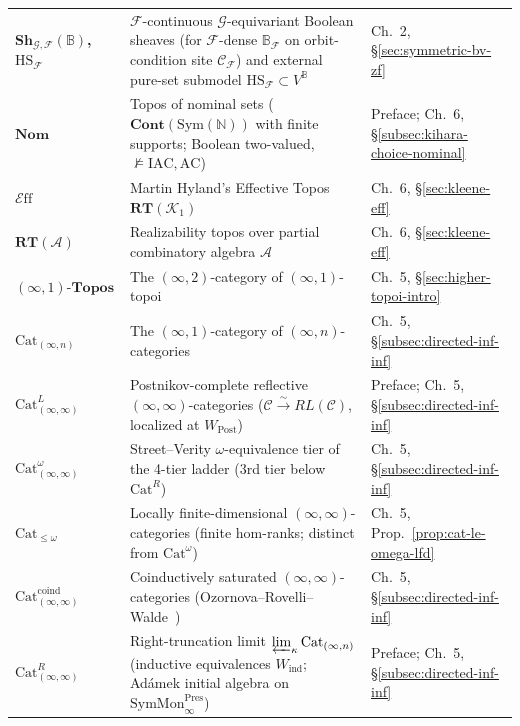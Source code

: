\documentclass[10pt,twoside,openright]{book}
\theoremstyle{crmplain}
\theoremstyle{crmdef}
\theoremstyle{crmremark}
\newcommand{\Eff}{\mathcal{E}\mathrm{ff}}
\begin{document}
{\begin{xltabular}{\textwidth}{@{}>{\bfseries}P{0.24\textwidth}YP{0.21\textwidth}@{}}
$\mathbf{Sh}_{\mathcal{G}, \mathcal{F}}(\mathbb{B})$,\, $\mathrm{HS}_{\mathcal{F}}$ & $\mathcal{F}$-continuous $\mathcal{G}$-equivariant Boolean sheaves (for $\mathcal{F}$-dense $\mathbb{B}_{\mathcal{F}}$ on orbit-condition site $\mathcal{C}_{\mathcal{F}}$) and external pure-set submodel $\mathrm{HS}_{\mathcal{F}} \subset V^{\mathbb{B}}$ & Ch.~2, \S\ref{sec:symmetric-bv-zf} \\
$\mathbf{Nom}$ & Topos of nominal sets ($\mathbf{Cont}(\mathrm{Sym}(\mathbb{N}))$ with finite supports; Boolean two-valued, $\not\models \mathrm{IAC}, \mathrm{AC}$) & Preface; Ch.~6, \S\ref{subsec:kihara-choice-nominal} \\
$\Eff$ & Martin Hyland's Effective Topos $\mathbf{RT}(\mathcal{K}_1)$ & Ch.~6, \S\ref{sec:kleene-eff} \\
$\mathbf{RT}(\mathcal{A})$ & Realizability topos over partial combinatory algebra $\mathcal{A}$ & Ch.~6, \S\ref{sec:kleene-eff} \\
$(\infty, 1)\text{-}\mathbf{Topos}$ & The $(\infty, 2)$-category of $(\infty, 1)$-topoi & Ch.~5, \S\ref{sec:higher-topoi-intro} \\
$\mathrm{Cat}_{(\infty, n)}$ & The $(\infty, 1)$-category of $(\infty, n)$-categories & Ch.~5, \S\ref{subsec:directed-inf-inf} \\
$\mathrm{Cat}^L_{(\infty, \infty)}$ & Postnikov-complete reflective $(\infty, \infty)$-categories ($\mathcal{C} \xrightarrow{\sim} RL(\mathcal{C})$, localized at $W_{\mathrm{Post}}$) & Preface; Ch.~5, \S\ref{subsec:directed-inf-inf} \\
$\mathrm{Cat}^\omega_{(\infty, \infty)}$ & Street--Verity $\omega$-equivalence tier of the 4-tier ladder (3rd tier below $\mathrm{Cat}^R$) & Ch.~5, \S\ref{subsec:directed-inf-inf} \\
$\mathrm{Cat}_{\le \omega}$ & Locally finite-dimensional $(\infty, \infty)$-categories (finite hom-ranks; distinct from $\mathrm{Cat}^\omega$) & Ch.~5, Prop.~\ref{prop:cat-le-omega-lfd} \\
$\mathrm{Cat}^{\mathrm{coind}}_{(\infty, \infty)}$ & Coinductively saturated $(\infty, \infty)$-categories (Ozornova--Rovelli--Walde~\cite{ORW26}) & Ch.~5, \S\ref{subsec:directed-inf-inf} \\
$\mathrm{Cat}^R_{(\infty, \infty)}$ & Right-truncation limit $\varprojlim_\kappa \mathrm{Cat}_{(\infty, n)}$ (inductive equivalences $W_{\mathrm{ind}}$; Ad\'amek initial algebra on $\mathrm{SymMon}^{\mathrm{Pres}}_\infty$) & Preface; Ch.~5, \S\ref{subsec:directed-inf-inf} \\

\end{xltabular}}
\end{document}
